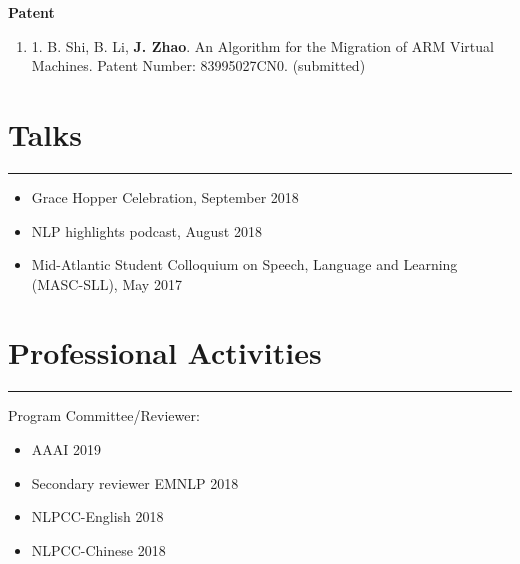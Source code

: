 \documentclass[11pt, a4paper]{article}
\newcommand{\hr}{\hrule\vspace{0.5em}}
\begin{document}
\vspace{0.5em}
\hspace{0.32in}\textbf{Patent}
\begin{enumerate}
	\item 1.	B. Shi, B. Li, \textbf{J. Zhao}. An Algorithm for the Migration of ARM Virtual Machines. Patent Number: 83995027CN0. (submitted)
\end{enumerate}

\section*{Talks}
\hr
\begin{itemize}
\item Grace Hopper Celebration, September 2018
\item NLP highlights podcast, August 2018
\item Mid-Atlantic Student Colloquium on Speech, Language and Learning (MASC-SLL), May 2017
\end{itemize}

\section*{Professional Activities}
\hr
Program Committee/Reviewer:
\begin{itemize}
\item AAAI 2019
\item Secondary reviewer EMNLP 2018
\item NLPCC-English 2018
\item NLPCC-Chinese 2018
\end{itemize}

\end{document}

